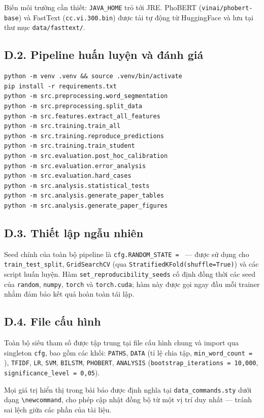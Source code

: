 Biến môi trường cần thiết: \texttt{JAVA\_HOME} trỏ tới JRE. PhoBERT (\texttt{vinai/phobert-base}) và FastText (\texttt{cc.vi.300.bin}) được tải tự động từ HuggingFace và lưu tại thư mục \texttt{data/fasttext/}.

\subsection*{D.2. Pipeline huấn luyện và đánh giá}

\begin{verbatim}
python -m venv .venv && source .venv/bin/activate
pip install -r requirements.txt
python -m src.preprocessing.word_segmentation
python -m src.preprocessing.split_data
python -m src.features.extract_all_features
python -m src.training.train_all
python -m src.training.reproduce_predictions
python -m src.training.train_student
python -m src.evaluation.post_hoc_calibration
python -m src.evaluation.error_analysis
python -m src.evaluation.hard_cases
python -m src.analysis.statistical_tests
python -m src.analysis.generate_paper_tables
python -m src.analysis.generate_paper_figures
\end{verbatim}

\subsection*{D.3. Thiết lập ngẫu nhiên}

Seed chính của toàn bộ pipeline là \texttt{cfg.RANDOM\_STATE = \randomstate{}} --- được sử dụng cho \texttt{train\_test\_split}, \texttt{GridSearchCV} (qua \texttt{StratifiedKFold(shuffle=True)}) và các script huấn luyện. Hàm \texttt{set\_reproducibility\_seeds} cố định đồng thời các seed của \texttt{random}, \texttt{numpy}, \texttt{torch} và \texttt{torch.cuda}; hàm này được gọi ngay đầu mỗi trainer nhằm đảm bảo kết quả hoàn toàn tái lập.

\subsection*{D.4. File cấu hình}

Toàn bộ siêu tham số được tập trung tại file cấu hình chung và import qua singleton \texttt{cfg}, bao gồm các khối: \texttt{PATHS}, \texttt{DATA} (tỉ lệ chia tập, \texttt{min\_word\_count = \minwordcount{}}), \texttt{TFIDF}, \texttt{LR}, \texttt{SVM}, \texttt{BILSTM}, \texttt{PHOBERT}, \texttt{ANALYSIS} (\texttt{bootstrap\_iterations = 10{,}000}, \texttt{significance\_level = 0{,}05}).

Mọi giá trị hiển thị trong bài báo được định nghĩa tại \texttt{data\_commands.sty} dưới dạng \texttt{\textbackslash newcommand}, cho phép cập nhật đồng bộ từ một vị trí duy nhất --- tránh sai lệch giữa các phần của tài liệu.
